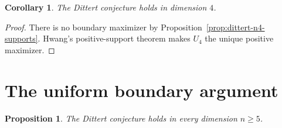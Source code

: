 \documentclass[11pt]{amsart}
\newtheorem{proposition}[theorem]{Proposition}
\newtheorem{corollary}[theorem]{Corollary}
\theoremstyle{definition}
\theoremstyle{remark}
\begin{document}
\begin{corollary}
The Dittert conjecture holds in dimension \(4\).
\end{corollary}

\begin{proof}
There is no boundary maximizer by
Proposition~\ref{prop:dittert-n4-supports}. Hwang's positive-support theorem
makes \(U_4\) the unique positive maximizer.
\end{proof}

\section{The uniform boundary argument}\label{sec:uniform}

\begin{proposition}\label{prop:dittert-nge5}
The Dittert conjecture holds in every dimension \(n\geq5\).
\end{proposition}
\end{document}
